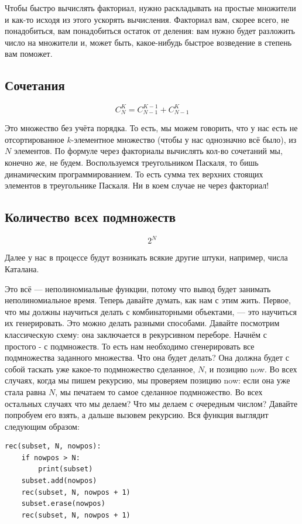 \documentclass[12pt]{article}
\begin{document}
Чтобы быстро вычислять факториал, нужно раскладывать на простые множители и как-то исходя из этого ускорять вычисления. Факториал вам, скорее всего, не понадобиться, вам понадобиться остаток от деления: вам нужно будет разложить число на множители и, может быть, какое-нибудь быстрое возведение в степень вам поможет. 

\subsection*{Сочетания}
\[
    C_N^K = C_{N-1}^{K-1} + C_{N-1}^{K}
\]

Это множество без учёта порядка. То есть, мы можем говорить, что у нас есть не отсортированное $k$-элементное множество (чтобы у нас однозначно всё было), из $N$ элементов. По формуле через факториалы вычислять кол-во сочетаний мы, конечно же, не будем. Воспользуемся треугольником Паскаля, то бишь динамическим программированием. То есть сумма тех верхних стоящих элементов в треугольнике Паскаля. Ни в коем случае не через факториал!

\subsection*{Количество всех подмножеств}
\[
    2^N
\]

Далее у нас в процессе будут возникать всякие другие штуки, например, числа Каталана.

Это всё --- неполиномиальные функции, потому что вывод будет занимать неполиномиальное время. Теперь давайте думать, как нам с этим жить. Первое, что мы должны научиться делать с комбинаторными объектами, --- это научиться их генерировать. Это можно делать разными способами. Давайте посмотрим классическую схему: она заключается в рекурсивном переборе. Начнём с простого - с подмножеств. То есть нам необходимо сгенерировать все подмножества заданного множества. Что она будет делать? Она должна будет с собой таскать уже какое-то подмножество сделанное, $N$, и позицию now. Во всех случаях, когда мы пишем рекурсию, мы проверяем позицию now: если она уже стала равна $N$, мы печатаем то самое сделанное подмножество. Во всех остальных случаях что мы делаем? Что мы делаем с очередным числом? Давайте попробуем его взять, а дальше вызовем рекурсию. Вся функция выглядит следующим образом:
\begin{verbatim}
rec(subset, N, nowpos):
    if nowpos > N:
        print(subset)
    subset.add(nowpos)
    rec(subset, N, nowpos + 1)
    subset.erase(nowpos)
    rec(subset, N, nowpos + 1)
\end{verbatim}
\end{document}
